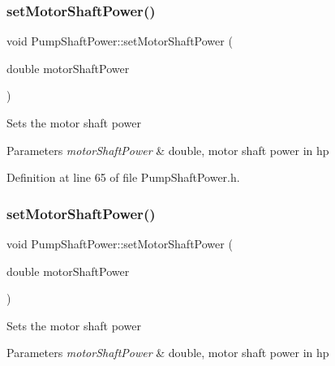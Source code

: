 \mbox{\label{class_pump_shaft_power_a77b8c621c7c92841dbd00112437c413b}} 
\subsubsection{\texorpdfstring{set\+Motor\+Shaft\+Power()}{setMotorShaftPower()}\hspace{0.1cm}{\footnotesize\ttfamily [2/3]}}
{\footnotesize\ttfamily void Pump\+Shaft\+Power\+::set\+Motor\+Shaft\+Power (\begin{DoxyParamCaption}\item[{double}]{motor\+Shaft\+Power }\end{DoxyParamCaption})\hspace{0.3cm}{\ttfamily [inline]}}

Sets the motor shaft power 
\begin{DoxyParams}{Parameters}
{\em motor\+Shaft\+Power} & double, motor shaft power in hp \\
\hline
\end{DoxyParams}


Definition at line 65 of file Pump\+Shaft\+Power.\+h.

\mbox{\label{class_pump_shaft_power_a77b8c621c7c92841dbd00112437c413b}} 
\subsubsection{\texorpdfstring{set\+Motor\+Shaft\+Power()}{setMotorShaftPower()}\hspace{0.1cm}{\footnotesize\ttfamily [3/3]}}
{\footnotesize\ttfamily void Pump\+Shaft\+Power\+::set\+Motor\+Shaft\+Power (\begin{DoxyParamCaption}\item[{double}]{motor\+Shaft\+Power }\end{DoxyParamCaption})\hspace{0.3cm}{\ttfamily [inline]}}

Sets the motor shaft power 
\begin{DoxyParams}{Parameters}
{\em motor\+Shaft\+Power} & double, motor shaft power in hp \\
\hline
\end{DoxyParams}


